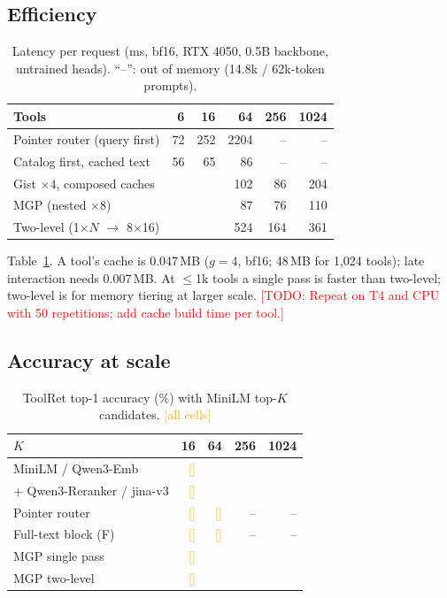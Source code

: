 \documentclass[sigconf,review,anonymous]{acmart}
\newcommand{\pending}[1]{\textcolor{orange}{[#1]}}
\newcommand{\todo}[1]{\textcolor{red}{[TODO: #1]}}
\newcommand{\method}{MGP}
\begin{document}
\subsection{Efficiency}
\begin{table}[t]
\caption{Latency per request (ms, bf16, RTX 4050, 0.5B backbone, untrained heads). ``--'': out of memory (14.8k / 62k-token prompts).}
\label{tab:latency}
\begin{tabular}{lrrrrr}
\toprule
Tools & 6 & 16 & 64 & 256 & 1024\\
\midrule
Pointer router (query first) & 72 & 252 & 2204 & -- & --\\
Catalog first, cached text & 56 & 65 & 86 & -- & --\\
Gist $\times4$, composed caches & & & 102 & 86 & 204\\
\method{} (nested $\times8$) & & & 87 & 76 & 110\\
Two-level (1$\times N$ $\to$ 8$\times$16) & & & 524 & 164 & 361\\
\bottomrule
\end{tabular}
\end{table}
Table~\ref{tab:latency}. A tool's cache is 0.047\,MB ($g{=}4$, bf16; 48\,MB for 1{,}024 tools); late interaction needs 0.007\,MB.
At $\le$1k tools a single pass is faster than two-level; two-level is for memory tiering at larger scale.
\todo{Repeat on T4 and CPU with 50 repetitions; add cache build time per tool.}

\subsection{Accuracy at scale}
\begin{table}[t]
\caption{ToolRet top-1 accuracy (\%) with MiniLM top-$K$ candidates. \pending{all cells}}
\label{tab:acc}
\begin{tabular}{lrrrr}
\toprule
$K$ & 16 & 64 & 256 & 1024\\
\midrule
MiniLM / Qwen3-Emb & \pending{} & & & \\
+ Qwen3-Reranker / jina-v3 & \pending{} & & & \\
Pointer router & \pending{} & \pending{} & -- & --\\
Full-text block (F) & \pending{} & \pending{} & -- & --\\
\method{} single pass & \pending{} & & & \\
\method{} two-level & \pending{} & & & \\
\bottomrule
\end{tabular}
\end{table}
\end{document}
